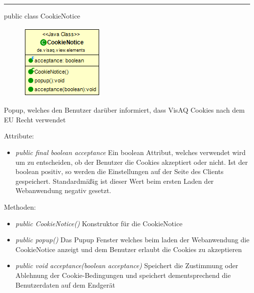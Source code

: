 \clearpage %
\rule{\textwidth}{0.4pt}
public class CookieNotice

\begin{minipage}{0.3\textwidth}
    \begin{figure}[H]
        \includegraphics[scale = 0.6]{media/frontend/view/de.view.elements/CookieNotice_Class.png}
    \end{figure}
    \end{minipage} \hfill
    \begin{minipage}{0.6\textwidth}
Popup, welches den Benutzer darüber informiert, dass VisAQ Cookies nach dem EU Recht verwendet
\end{minipage}

Attribute:
\begin{itemize}
    \item \emph{public final boolean acceptance} Ein boolean Attribut, welches verwendet wird um zu entscheiden, ob der Benutzer die Cookies akzeptiert oder nicht. Ist der boolean positiv, so werden die Einstellungen auf der Seite des Clients gespeichert. Standardmäßig ist dieser Wert beim ersten Laden der Webanwendung negativ gesetzt.
\end{itemize}
Methoden:
\begin{itemize}
    \item \emph{public CookieNotice()} Konstruktor für die CookieNotice
    \item \emph{public popup()} Das Pupup Fenster welches beim laden der Webanwendung die CookieNotice anzeigt und dem Benutzer erlaubt die Cookies zu akzeptieren
    \item \emph{public void acceptance(boolean acceptance)} Speichert die Zustimmung oder Ablehnung der Cookie-Bedingungen und speichert dementsprechend die Benutzerdaten auf dem Endgerät
\end{itemize}
